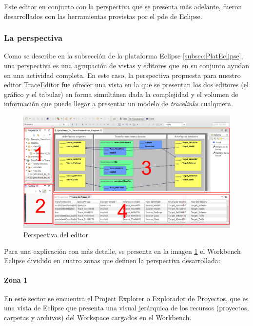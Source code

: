 \documentclass[a4paper,12pt,oneside,spanish]{book}
\begin{document}
Este editor en conjunto con la perspectiva que se presenta más adelante, fueron desarrollados con las herramientas provistas por el \gls{pde} de \textsf{Eclipse}.


\subsubsection{La perspectiva}

Como se describe en la subsección de la plataforma \textsf{Eclipse} \ref{subsec:PlatEclipse}, una perspectiva es una agrupación de vistas y editores que en su conjunto ayudan en una actividad completa. En este caso, la perspectiva propuesta para nuestro editor \textsf{TraceEditor} fue ofrecer una vista en la que se presentan los dos editores (el gráfico y el tabular) en forma simultánea dada la complejidad y el volumen de información que puede llegar a presentar un modelo de \textit{tracelinks} cualquiera.


\begin{figure}[hbtp]
\centering
\includegraphics[scale=.29]{./img/TraceEditorPerspectiva}
\caption{Perspectiva del editor}
\label{fig:TraceEditorPerspectiva}
\end{figure}


Para una explicación con más detalle, se presenta en la imagen \ref{fig:TraceEditorPerspectiva} el Workbench \textsf{Eclipse} dividido en cuatro zonas que definen la perspectiva desarrollada:


\paragraph{Zona 1}
En este sector se encuentra el \textsf{Project Explorer} o Explorador de Proyectos, que es una vista de \textsf{Eclipse} que presenta una visual jerárquica de los recursos (proyectos, carpetas y archivos) del Workspace cargados en el Workbench.
\end{document}
